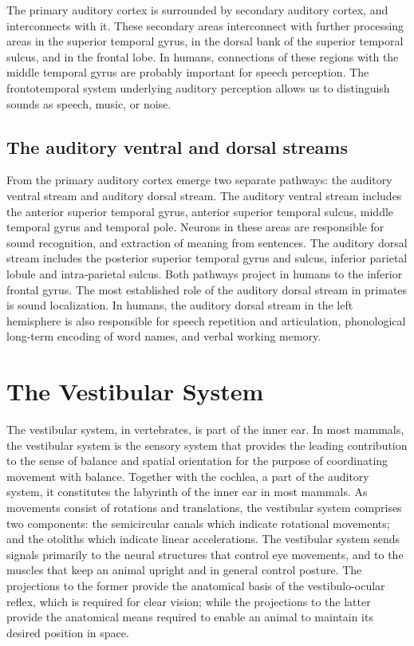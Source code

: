 The primary auditory cortex is surrounded by secondary auditory cortex, and interconnects with it. These secondary areas interconnect with further processing areas in the superior temporal gyrus, in the dorsal bank of the superior temporal sulcus, and in the frontal lobe. In humans, connections of these regions with the middle temporal gyrus are probably important for speech perception. The frontotemporal system underlying auditory perception allows us to distinguish sounds as speech, music, or noise.

\hypertarget{the-auditory-ventral-and-dorsal-streams}{%
\subsection{The auditory ventral and dorsal streams}\label{the-auditory-ventral-and-dorsal-streams}}

From the primary auditory cortex emerge two separate pathways: the auditory ventral stream and auditory dorsal stream. The auditory ventral stream includes the anterior superior temporal gyrus, anterior superior temporal sulcus, middle temporal gyrus and temporal pole. Neurons in these areas are responsible for sound recognition, and extraction of meaning from sentences. The auditory dorsal stream includes the posterior superior temporal gyrus and sulcus, inferior parietal lobule and intra-parietal sulcus. Both pathways project in humans to the inferior frontal gyrus. The most established role of the auditory dorsal stream in primates is sound localization. In humans, the auditory dorsal stream in the left hemisphere is also responsible for speech repetition and articulation, phonological long-term encoding of word names, and verbal working memory.

\hypertarget{the-vestibular-system}{%
\section{The Vestibular System}\label{the-vestibular-system}}

The vestibular system, in vertebrates, is part of the inner ear. In most mammals, the vestibular system is the sensory system that provides the leading contribution to the sense of balance and spatial orientation for the purpose of coordinating movement with balance. Together with the cochlea, a part of the auditory system, it constitutes the labyrinth of the inner ear in most mammals. As movements consist of rotations and translations, the vestibular system comprises two components: the semicircular canals which indicate rotational movements; and the otoliths which indicate linear accelerations. The vestibular system sends signals primarily to the neural structures that control eye movements, and to the muscles that keep an animal upright and in general control posture. The projections to the former provide the anatomical basis of the vestibulo-ocular reflex, which is required for clear vision; while the projections to the latter provide the anatomical means required to enable an animal to maintain its desired position in space.

